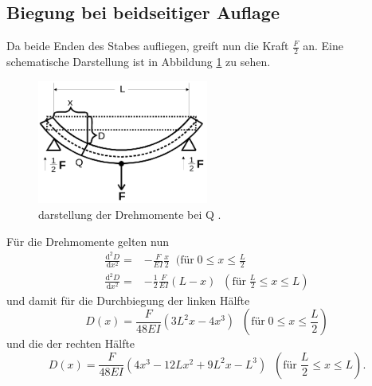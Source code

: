 \subsection{Biegung bei beidseitiger Auflage}
Da beide Enden des Stabes aufliegen, greift nun die Kraft $\frac{F}{2}$ an.
Eine schematische Darstellung ist in Abbildung \ref{fig:Beidseitige_Einspannung}
zu sehen.
\begin{figure}[H]
  \centering
  \includegraphics[width=0.5\textwidth]{Beidseitige_Einspannung.png}
  \caption{darstellung der Drehmomente bei Q \cite{sample}.}
  \label{fig:Beidseitige_Einspannung}
\end{figure}
Für die Drehmomente gelten nun
\begin{align}
  \frac{\text{d}^2D}{\text{d}x^2}=&-\frac{F}{EI}\frac{x}{2}\;\;(\text{für}\;0\le x \le \frac{L}{2}\\
  \frac{\text{d}^2D}{\text{d}x^2}=&-\frac{1}{2}\frac{F}{EI}(L-x)\;\; (\text{für}\; \frac{L}{2} \le x \le L)
\end{align}
und damit für die Durchbiegung der linken Hälfte
\begin{equation}
  D(x)=\frac{F}{48EI}\left(3L^2x-4x^3\right)\;\;(\text{für}\;0\le x \le \frac{L}{2})
  \label{eqn:durchbiegung_links}
\end{equation}
und die der rechten Hälfte
\begin{equation}
  D(x)=\frac{F}{48EI}\left(4x^3-12Lx^2+9L^2x-L^3\right)\;\;
  (\text{für}\; \frac{L}{2} \le x \le L).
  \label{eqn:durchbiegung_rechts}
\end{equation}
\cite{sample}
